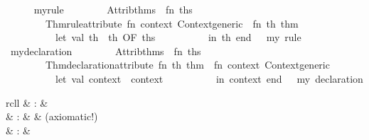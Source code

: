 \begin{isabellebody}
\begin{isamarkuptext}
\begin{description}
  \end{description}%
\end{isamarkuptext}%
\isamarkuptrue%
%
\isadelimML
\ \ \ \ %
\endisadelimML
%
\isatagML
{}\isamarkupfalse%
\ my{\isacharunderscore}rule\ {\isacharequal}\ {\isacharverbatimopen}\isanewline
\ \ \ \ \ \ Attrib{\isachardot}thms\ {\isachargreater}{\isachargreater}\ {\isacharparenleft}fn\ ths\ {\isacharequal}{\isachargreater}\isanewline
\ \ \ \ \ \ \ \ Thm{\isachardot}rule{\isacharunderscore}attribute\ {\isacharparenleft}fn\ context{\isacharcolon}\ Context{\isachardot}generic\ {\isacharequal}{\isachargreater}\ fn\ th{\isacharcolon}\ thm\ {\isacharequal}{\isachargreater}\isanewline
\ \ \ \ \ \ \ \ \ \ let\ val\ th{\isacharprime}\ {\isacharequal}\ th\ OF\ ths\isanewline
\ \ \ \ \ \ \ \ \ \ in\ th{\isacharprime}\ end{\isacharparenright}{\isacharparenright}\ {\isacharverbatimclose}\ \ {\isachardoublequoteopen}my\ rule{\isachardoublequoteclose}\isanewline
\isanewline
\ \ \ \ \isamarkupfalse%
\ my{\isacharunderscore}declaration\ {\isacharequal}\ {\isacharverbatimopen}\isanewline
\ \ \ \ \ \ Attrib{\isachardot}thms\ {\isachargreater}{\isachargreater}\ {\isacharparenleft}fn\ ths\ {\isacharequal}{\isachargreater}\isanewline
\ \ \ \ \ \ \ \ Thm{\isachardot}declaration{\isacharunderscore}attribute\ {\isacharparenleft}fn\ th{\isacharcolon}\ thm\ {\isacharequal}{\isachargreater}\ fn\ context{\isacharcolon}\ Context{\isachardot}generic\ {\isacharequal}{\isachargreater}\isanewline
\ \ \ \ \ \ \ \ \ \ let\ val\ context{\isacharprime}\ {\isacharequal}\ context\isanewline
\ \ \ \ \ \ \ \ \ \ in\ context{\isacharprime}\ end{\isacharparenright}{\isacharparenright}\ {\isacharverbatimclose}\ \ {\isachardoublequoteopen}my\ declaration{\isachardoublequoteclose}%
\endisatagML
{\isafoldML}%
%
\isadelimML
%
\endisadelimML
%
\isamarkuptrue%
%
\isamarkuptrue%
%
\begin{isamarkuptext}%
\begin{matharray}{rcll}
    \hypertarget{command.classes}{\hyperlink{command.classes}{\mbox{}}} & : &  \\
    \hypertarget{command.classrel}{\hyperlink{command.classrel}{\mbox{}}} & : &  & (axiomatic!) \\
    \hypertarget{command.default-sort}{\hyperlink{command.default-sort}{\mbox{}}} & : & 
  \end{matharray}


\end{isamarkuptext}
\end{isabellebody}
